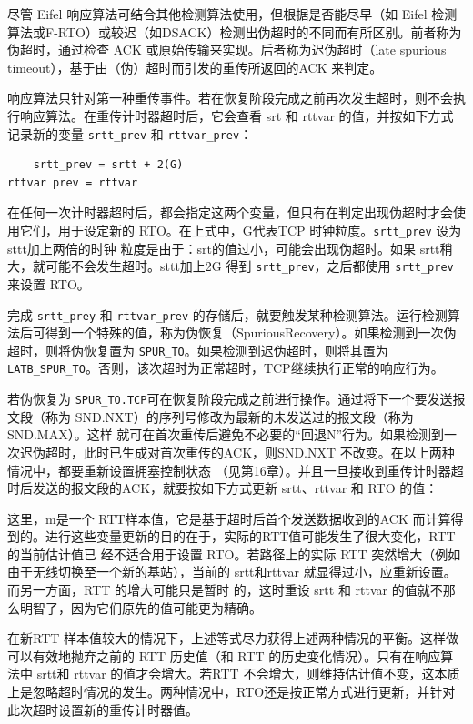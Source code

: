 尽管 Eifel 响应算法可结合其他检测算法使用，但根据是否能尽早（如 Eifel 检测算法或F-RTO）或较迟（如DSACK）检测出伪超时的不同而有所区别。前者称为伪超时，通过检查
ACK 或原始传输来实现。后者称为迟伪超时（late spurious timeout），基于由（伪）超时而引发的重传所返回的ACK 来判定。

响应算法只针对第一种重传事件。若在恢复阶段完成之前再次发生超时，则不会执行响应算法。在重传计时器超时后，它会查看 srt 和 rttvar 的值，并按如下方式记录新的变量
\verb|srtt_prev| 和 \verb|rttvar_prev|：

\begin{verbatim}
    srtt_prev = srtt + 2(G)
rttvar prev = rttvar
\end{verbatim}

在任何一次计时器超时后，都会指定这两个变量，但只有在判定出现伪超时才会使用它们，用于设定新的 RTO。在上式中，G代表TCP 时钟粒度。\verb|srtt_prev| 设为 sttt加上两倍的时钟
粒度是由于：srt的值过小，可能会出现伪超时。如果 srtt稍大，就可能不会发生超时。sttt加上2G 得到 \verb|srtt_prev|，之后都使用 \verb|srtt_prev| 来设置 RTO。

完成 \verb|srtt_prey| 和 \verb|rttvar_prev| 的存储后，就要触发某种检测算法。运行检测算法后可得到一个特殊的值，称为伪恢复（SpuriousRecovery）。如果检测到一次伪超时，则将伪恢复置为
\verb|SPUR_TO|。如果检测到迟伪超时，则将其置为 \verb|LATB_SPUR_TO|。否则，该次超时为正常超时，TCP继续执行正常的响应行为。

若伪恢复为 \verb|SPUR_TO.TCP|可在恢复阶段完成之前进行操作。通过将下一个要发送报文段（称为 SND.NXT）的序列号修改为最新的未发送过的报文段（称为 SND.MAX）。这样
就可在首次重传后避免不必要的“回退N”行为。如果检测到一次迟伪超时，此时已生成对首次重传的ACK，则SND.NXT 不改变。在以上两种情况中，都要重新设置拥塞控制状态
（见第16章）。并且一旦接收到重传计时器超时后发送的报文段的ACK，就要按如下方式更新 srtt、rttvar 和 RTO 的值：

这里，m是一个 RTT样本值，它是基于超时后首个发送数据收到的ACK 而计算得到的。进行这些变量更新的目的在于，实际的RTT值可能发生了很大变化，RTT 的当前估计值已
经不适合用于设置 RTO。若路径上的实际 RTT 突然增大（例如由于无线切换至一个新的基站），当前的 srtt和rttvar 就显得过小，应重新设置。而另一方面，RTT 的增大可能只是暂时
的，这时重设 srtt 和 rttvar 的值就不那么明智了，因为它们原先的值可能更为精确。

在新RTT 样本值较大的情况下，上述等式尽力获得上述两种情况的平衡。这样做可以有效地抛弃之前的 RTT 历史值（和 RTT 的历史变化情况）。只有在响应算法中 srtt和 rttvar
的值才会增大。若RTT 不会增大，则维持估计值不变，这本质上是忽略超时情况的发生。两种情况中，RTO还是按正常方式进行更新，并针对此次超时设置新的重传计时器值。

